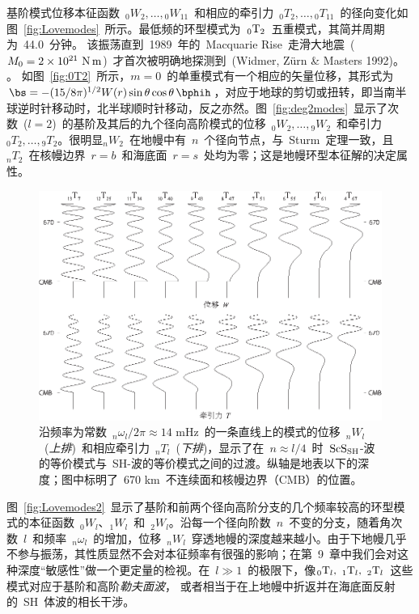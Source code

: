 基阶模式位移本征函数~${}_0W_2,\ldots,{}_0W_{11}$~和相应的牵引力~${}_0T_2,\ldots,{}_0T_{11}$~的径向变化如图~\ref{fig:Lovemodes}~所示。最低频的环型模式为~${}_0{\rm T}_2$~五重模式，其简并周期为~44.0~分钟。
%
该振荡直到~1989~年的~Macquarie Rise~走滑大地震~($M_0=2\times10^{21}~{\rm N}\,{\rm m}$)~才首次被明确地探测到~(Widmer, Z\"{u}rn \& Masters 1992)。 \nocite{widmer&zurn92a}。
%
如图~\ref{fig:0T2}~所示，$m=0$~的单重模式有一个相应的矢量位移，其形式为~$\bs=-(15/8\pi)^{1/2}
W(r)\sin\theta\cos\theta\,\bphih$，对应于地球的剪切或扭转，即当南半球逆时针移动时，北半球顺时针移动，反之亦然。图~\ref{fig:deg2modes}~显示了次数~($l=2$)~的基阶及其后的九个径向高阶模式的位移~${}_0W_2,\ldots,{}_9W_2$~和牵引力~${}_0T_2,\ldots,{}_9T_2$。很明显${}_nW_2$~在地幔中有~$n$~个径向节点，与~Sturm~定理一致，且~${}_nT_2$~在核幔边界~$r=b$~和海底面~$r=s$~处均为零；这是地幔环型本征解的决定属性。

\begin{figure}[!t]
\begin{center}
\includegraphics{../figures/chap08/fig08.eps}
\end{center}
\caption[S&ScSmodes]{\label{fig:S&ScSmodes}
沿频率为常数~${}_n\omega_l/2\pi\approx 14$ mHz~的一条直线上的模式的位移~${}_nW_l$~({\em 上排\/})~和相应牵引力~${}_nT_l$~({\em 下排\/})，显示了在~$n\approx l/4$~时~${\rm ScS}_{\rm SH}$-波的等价模式与~SH-波的等价模式之间的过渡。纵轴是地表以下的深度；图中标明了~670 km~不连续面和核幔边界（CMB）的位置。
}
\end{figure}
图~\ref{fig:Lovemodes2}~显示了基阶和前两个径向高阶分支的几个频率较高的环型模式的本征函数~${}_0W_l$、${}_1W_l$~和~${}_2W_l$。沿每一个径向阶数~$n$~不变的分支，随着角次数~$l$~和频率~${}_n\omega_l$~的增加，位移~${}_nW_l$~穿透地幔的深度越来越小。由于下地幔几乎不参与振荡，其性质显然不会对本征频率有很强的影响；在第~9~章中我们会对这种深度“敏感性”做一个更定量的检视。在~$l\gg 1$~的极限下，像${}_0{\rm T}_l,~{}_1{\rm T}_l,~{}_2{\rm T}_l$~这些模式对应于基阶和高阶{\em 勒夫面波\/}，
%
%
%
或者相当于在上地幔中折返并在海底面反射的~SH~体波的相长干涉。

